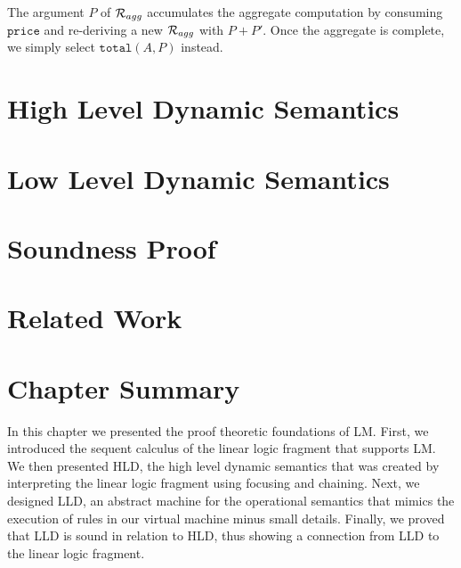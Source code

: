 The argument $P$ of $\mathcal{R}_{agg}$ accumulates the aggregate computation by
consuming $\mathtt{price}$ and re-deriving a new $\mathcal{R}_{agg}$ with $P +
P'$. Once the aggregate is complete, we simply select $\mathtt{total}(A, P)$
instead.

\section{High Level Dynamic Semantics}



\section{Low Level Dynamic Semantics}

\section{Soundness Proof}

\section{Related Work}

\section{Chapter Summary}

In this chapter we presented the proof theoretic foundations of LM.  First, we
introduced the sequent calculus of the linear logic fragment that supports LM. We then
presented HLD, the high level dynamic semantics that was created by interpreting
the linear logic fragment using focusing and chaining. Next, we designed LLD,
an abstract machine for the operational semantics that mimics the execution of
rules in our virtual machine minus small details.  Finally, we proved that LLD is sound
in relation to HLD, thus showing a connection from LLD to the linear logic
fragment.

